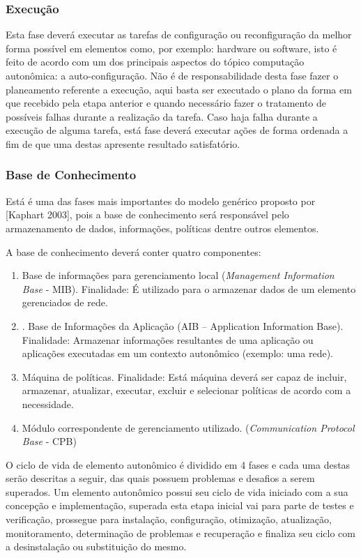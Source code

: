 \documentclass[11pt,twoside]{article}
\begin{document}
\subsubsection{Execução}
Esta fase deverá executar as tarefas de configuração ou reconfiguração da melhor forma possível em elementos como, por exemplo: hardware ou software, isto é feito de acordo com um dos principais aspectos do tópico computação autonômica: a auto-configuração. Não é de responsabilidade desta fase fazer o planeamento referente a execução, aqui basta ser executado o plano da forma em que recebido pela etapa anterior e quando necessário fazer o tratamento de possíveis falhas durante a realização da tarefa. Caso haja falha durante a execução de alguma tarefa, está fase deverá executar ações de forma ordenada a fim de que uma destas apresente resultado satisfatório.

\subsubsection{Base de Conhecimento}
Está é uma das fases mais importantes do modelo genérico proposto por [Kaphart 2003], pois a base de conhecimento será responsável pelo armazenamento de dados, informações, políticas dentre outros elementos.

A base de conhecimento deverá conter quatro componentes: 
\begin{enumerate}

\item	Base de informações para gerenciamento local (\textit{Management Information Base} - MIB).
Finalidade: É utilizado para o armazenar dados de um elemento gerenciados de rede.

\item.	Base de Informações da Aplicação (AIB – Application Information Base).
Finalidade: Armazenar informações resultantes de uma aplicação ou aplicações executadas em um contexto autonômico (exemplo: uma rede).

\item Máquina de políticas. 
Finalidade: Está máquina deverá ser capaz de incluir, armazenar, atualizar, executar, excluir e selecionar políticas de acordo com a necessidade.

\item Módulo correspondente de gerenciamento utilizado. (\textit{Communication Protocol Base} - CPB)
\end{enumerate}

O ciclo de vida de elemento autonômico é dividido em 4 fases e cada uma destas serão descritas a seguir, das quais possuem problemas e desafios a serem superados. Um elemento autonômico possui seu ciclo de vida iniciado com a sua concepção e implementação, superada esta etapa inicial vai para parte de testes e verificação, prossegue para instalação, configuração, otimização, atualização, monitoramento, determinação de problemas e recuperação e finaliza seu ciclo com a desinstalação ou substituição do mesmo.
\end{document}
